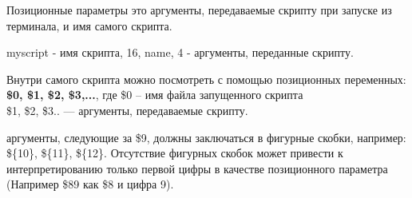 \begin{defi}{Позиционные параметры}
	это аргументы, передаваемые скрипту при запуске из терминала, и имя самого скрипта. 
\end{defi}

	myscript - имя скрипта, 16, name, 4 - аргументы, переданные скрипту.

Внутри самого скрипта можно посмотреть с помощью позиционных переменных: \textbf{\$0, \$1, \$2, \$3,...}, где
	\$0 -- имя файла запущенного скрипта \\
	\$1, \$2, \$3..	 --- аргументы, передаваемые скрипту.

\begin{important}
	аргументы, следующие за \$9, должны заключаться в фигурные скобки, например: \$\{10\}, \$\{11\}, \$\{12\}. Отсутствие фигурных скобок может привести к интерпретированию только первой цифры в качестве позиционного параметра (Например \$89 как \$8 и цифра 9).
\end{important}
